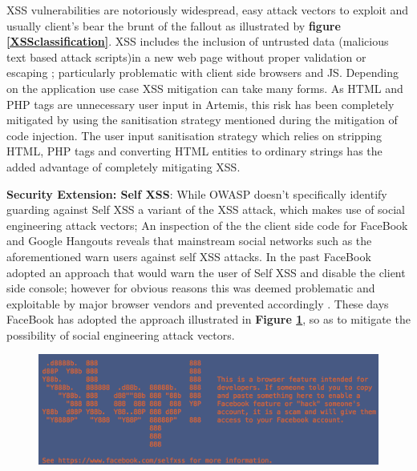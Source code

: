 \begin{enumerate}
    XSS vulnerabilities are notoriously widespread, easy attack vectors to exploit and  usually client's bear the brunt of the fallout \cite{OWASP2017} as illustrated by \textbf{figure \ref{XSSclassification}}. XSS includes the inclusion of untrusted data (malicious text based attack scripts)in a new web page without proper validation or escaping \cite{OWASP2017}; particularly problematic with client side browsers and JS. Depending on the application use case XSS mitigation can take many forms. As HTML and PHP tags are  unnecessary user input in Artemis, this risk has been completely mitigated by using the sanitisation strategy mentioned during the mitigation of code injection. The user input sanitisation strategy which relies on stripping HTML, PHP tags and   converting HTML entities  to ordinary strings has the added advantage of completely mitigating XSS.
    
    \textbf{Security Extension: Self XSS}:
    While OWASP doesn't specifically identify guarding against Self XSS  a variant of the XSS attack, which makes use of social engineering attack vectors\cite{FaceBook}; An inspection of the  the client side code for FaceBook and Google Hangouts reveals that mainstream social networks such as the aforementioned warn users against self XSS attacks. In the past FaceBook adopted an approach that would warn the user of Self XSS and disable the client side console; however for obvious reasons this was deemed problematic and exploitable by major browser vendors and prevented accordingly \cite{StackO}. These days FaceBook has adopted the approach illustrated in \textbf{Figure \ref{faceBookSelfXSS}}, so as to mitigate the possibility of social engineering attack vectors.
    
    \begin{figure}[h]
    	\centering
    	\includegraphics[scale=0.75,right]{chapters/chapter03/figures/faceBook.png}
    	\label{faceBookSelfXSS}
    \end{figure}
    

\end{enumerate}
